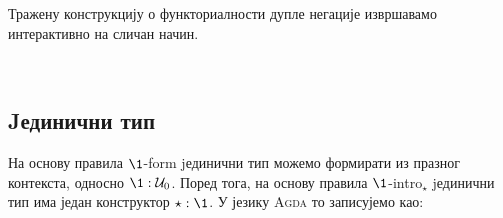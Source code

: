 Тражену конструкцију о функториалности дупле негације извршавамо интерактивно на сличан начин.
\begin{code}%
\>[0]\AgdaSpace{}%
\AgdaSymbol{:}\AgdaSpace{}%
\AgdaSymbol{\{}\AgdaSpace{}%
\AgdaSymbol{:}\AgdaSpace{}%
\AgdaSpace{}%
\AgdaSpace{}%
\AgdaSymbol{\}}\AgdaSpace{}%
\AgdaSymbol{\{}\AgdaSpace{}%
\AgdaSymbol{:}\AgdaSpace{}%
\AgdaSpace{}%
\AgdaSpace{}%
\AgdaSymbol{\}}\AgdaSpace{}%
\AgdaSpace{}%
\AgdaSymbol{(}\AgdaSpace{}%
\AgdaSpace{}%
\AgdaSymbol{)}\AgdaSpace{}%
\AgdaSpace{}%
\AgdaSymbol{(}\AgdaSpace{}%
\AgdaSpace{}%
\AgdaSpace{}%
\AgdaSpace{}%
\AgdaSymbol{)}\<%
\\
\>[0]\AgdaSpace{}%
\AgdaSpace{}%
\AgdaSpace{}%
\AgdaSpace{}%
\AgdaSymbol{=}\AgdaSpace{}%
\AgdaSpace{}%
\AgdaSymbol{(}\AgdaSpace{}%
\AgdaSpace{}%
\AgdaSymbol{)}\<%
\end{code}

\subsection{Jединични тип}

На основу правила $\1$-form jединични тип можемо формирати из празног контекста, односно $\1 : \mathcal{U}_0$. Поред тога, на основу правила $\1$-intro$_\star$ jединични тип има један конструктор $\star : \1$. У језику \textsc{Agda} то записујемо као:
\begin{code}%
\>[0]\AgdaSpace{}%
\AgdaSpace{}%
\AgdaSymbol{:}\AgdaSpace{}%
\AgdaSpace{}%
\AgdaSpace{}%
\<%
\\
\>[0][@{}l@{\AgdaIndent{0}}]%
\>[4]\AgdaSpace{}%
\AgdaSymbol{:}\AgdaSpace{}%
\<%
\end{code}

